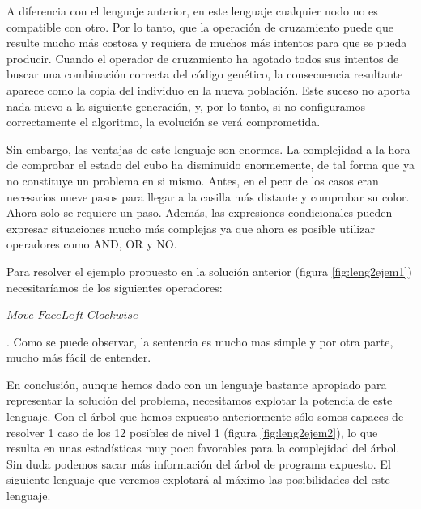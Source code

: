 A diferencia con el lenguaje anterior, en este lenguaje cualquier nodo no es
compatible con otro. Por lo tanto, que la operación de cruzamiento puede que
resulte mucho más costosa y requiera de muchos más intentos para que se pueda
producir. Cuando el operador de cruzamiento ha agotado todos sus intentos de
buscar una combinación correcta del código genético, la consecuencia resultante
aparece como la copia del individuo en la nueva población. Este suceso no aporta
nada nuevo a la siguiente generación, y, por lo tanto, si no configuramos
correctamente el algoritmo, la evolución se verá comprometida.

Sin embargo, las ventajas de este lenguaje son enormes. La complejidad a la hora
de comprobar el estado del cubo ha disminuido enormemente, de tal forma que ya no
constituye un problema en si mismo. Antes, en el peor de los casos eran
necesarios nueve pasos para llegar a la casilla más distante y comprobar su
color. Ahora solo se requiere un paso. Además, las expresiones condicionales
pueden expresar situaciones mucho más complejas ya que ahora es posible utilizar
operadores como AND, OR y NO.

Para resolver el ejemplo propuesto en la solución anterior (figura
\ref{fig:leng2ejem1}) necesitaríamos de los siguientes operadores: 

\begin{algorithmic}
	\STATE $Move$ $FaceLeft$ $Clockwise$
\ENDIF 
\end{algorithmic}
. Como se puede observar, la sentencia es mucho mas
simple y por otra parte, mucho más fácil de entender.

En conclusión, aunque hemos dado con un lenguaje bastante apropiado para
representar la solución del problema, necesitamos explotar la potencia de este
lenguaje. Con el árbol que hemos expuesto anteriormente sólo somos capaces de
resolver 1 caso de los 12 posibles de nivel 1 (figura \ref{fig:leng2ejem2}), lo
que resulta en unas estadísticas muy poco favorables para la complejidad del árbol. Sin duda podemos
sacar más información del árbol de programa expuesto. El siguiente lenguaje que
veremos explotará al máximo las posibilidades del este lenguaje.





